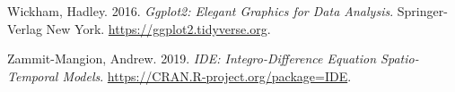\begin{CSLReferences}{1}{0}
\leavevmode{}%
Wickham, Hadley. 2016. \emph{Ggplot2: Elegant Graphics for Data Analysis}. Springer-Verlag New York. \url{https://ggplot2.tidyverse.org}.

\leavevmode{}%
Zammit-Mangion, Andrew. 2019. \emph{IDE: Integro-Difference Equation Spatio-Temporal Models}. \url{https://CRAN.R-project.org/package=IDE}.

\end{CSLReferences}



\address{%
Devin W. Goodsman\\
Natural Resources Canada\\%
5320 122 St NW,\\ Edmonton, Alberta, T6H 3S5\\ Canada\\
%
NA\\%
\textit{ORCiD: \href{https://orcid.org/0000-0003-1935-5779}{0000-0003-1935-5779}}\\%
\href{mailto:devin.goodsman@nrcan-rncan.gc.ca}{\nolinkurl{devin.goodsman@nrcan-rncan.gc.ca}}%
}
